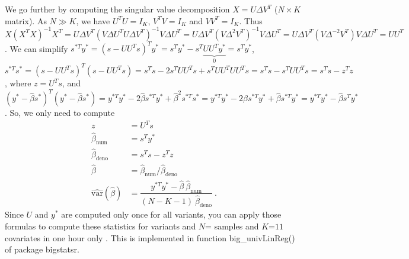 We go further by computing the singular value decomposition $X = U \Delta V^T$ ($N \times K$ matrix). As $N \gg K$, we have $U^T U = I_K$, $V^T V  = I_K$ and $V V^T = I_K$. Thus $X (X^T X)^{-1} X^T = U \Delta V^T (V \Delta U^T U \Delta V^T)^{-1} V \Delta U^T = U \Delta V^T (V \Delta^2 V^T)^{-1} V \Delta U^T = U \Delta V^T (V \Delta^{-2} V^T) V \Delta U^T = U U^T$.
We can simplify $s^{*T} y^* = (s - U U^T s)^T y^* = s^T y^* - s^T \underbrace{U U^T y^*}_0 = s^T y^*$, 
$s^{*T} s^* = (s - U U^T s)^T (s - U U^T s) = s^T s - 2 s^T U U^T s + s^T U U^T U U^T s = s^T s - s^T U U^T s = s^T s - z^T z$, where $z = U^T s$, 
and $(y^* - \hat{\beta} s^*)^T (y^* - \hat{\beta} s^*) = y^{*T} y^* - 2 \hat{\beta} s^{*T} y^* + \hat{\beta}^2 s^{*T} s^* = y^{*T} y^* - 2 \hat{\beta} s^{*T} y^* + \hat{\beta} s^{*T} y^* = y^{*T} y^* - \hat{\beta} s^{T} y^*$.
So, we only need to compute
\begin{align*}
z &= U^T s \\
\hat{\beta}_{\text{num}} &= s^{T} y^* \\
\hat{\beta}_{\text{deno}} &= s^T s - z^T z \\
\hat{\beta} &= \hat{\beta}_{\text{num}} / \hat{\beta}_{\text{deno}} \\
\widehat{\text{var}}(\hat{\beta}) &= \dfrac{y^{*T} y^* - \hat{\beta} ~ \hat{\beta}_{\text{num}}}{(N - K - 1) ~ \hat{\beta}_{\text{deno}}}~.
\end{align*}
Since $U$ and $y^*$ are computed only once for all variants, you can apply those formulas to compute these statistics for  variants and $N$= samples and $K$=$11$ covariates in one hour only \cite[]{prive2018efficient}. This is implemented in function big\_univLinReg() of package bigstatsr.



